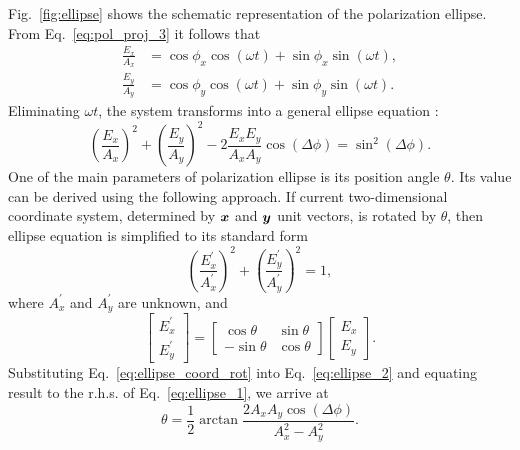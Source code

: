 Fig.~\ref{fig:ellipse} shows the schematic representation of the polarization ellipse.
From Eq.~\ref{eq:pol_proj_3} it follows that 
\begin{equation}
    \begin{aligned}
        \frac{E_x}{A_x} & = \cos\phi_x \cos (\omega t) + \sin \phi_x \sin(\omega t), \\
        \frac{E_y}{A_y} & = \cos\phi_y \cos (\omega t) + \sin \phi_y \sin(\omega t).
    \end{aligned}
\end{equation}
Eliminating $\omega t$, the system transforms into a general ellipse equation \citep{PolarizedLight2}:
\begin{equation}
    \label{eq:ellipse_1}
    \left(\frac{E_x}{A_x}\right)^2 + \left(\frac{E_y}{A_y}\right)^2 - 2\frac{E_x E_y}{A_x A_y}\cos(\Delta \phi) = \sin^2 (\Delta \phi).
\end{equation}
One of the main parameters of polarization ellipse is its position angle $\theta$.
Its value can be derived using the following approach.
If current two-dimensional coordinate system, determined by $\boldsymbol{x}$ and $\boldsymbol{y}$ unit vectors, is rotated by $\theta$, then ellipse equation is simplified to its standard form
\begin{equation}
    \label{eq:ellipse_2}
    \left(\frac{E_x^\prime}{A_x^\prime}\right)^2 + \left(\frac{E_y^\prime}{A_y^\prime}\right)^2 = 1,
\end{equation}
where $A_x^\prime$ and $A_y^\prime$ are unknown, and 
\begin{equation}
    \label{eq:ellipse_coord_rot}
    \begin{bmatrix}
        E_x^\prime\\
        E_y^\prime
    \end{bmatrix} =
    \begin{bmatrix}
        \cos \theta & \sin \theta \\
        -\sin \theta & \cos \theta
    \end{bmatrix}
    \begin{bmatrix}
        E_x \\
        E_y
    \end{bmatrix}.
\end{equation}
Substituting Eq.~\ref{eq:ellipse_coord_rot} into Eq.~\ref{eq:ellipse_2} and equating result to the r.h.s. of Eq.~\ref{eq:ellipse_1}, we arrive at \citep{PolarizedLight2}
\begin{equation}
    \theta = \frac{1}{2}\arctan\frac{2A_x A_y \cos (\Delta \phi)}{A_x^2 - A_y^2}.
\end{equation}

